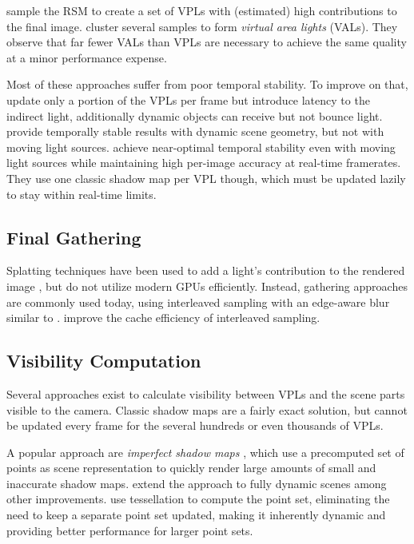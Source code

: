 \citet{georgiev2010simple, ritschel2011ismsViewAdaptive} sample the RSM to create a set of VPLs with (estimated) high contributions to the final image. \citet{dong2009real, prutkin2012reflective} cluster several samples to form \emph{virtual area lights} (VALs). They observe that far fewer VALs than VPLs are necessary to achieve the same quality at a minor performance expense.

Most of these approaches suffer from poor temporal stability. To improve on that, \citet{laine2007incremental} update only a portion of the VPLs per frame but introduce latency to the indirect light, additionally dynamic objects can receive but not bounce light. \citet{barak2013temporally} provide temporally stable results with dynamic scene geometry, but not with moving light sources. \citet{hedman2016sequential} achieve near-optimal temporal stability even with moving light sources while maintaining high per-image accuracy at real-time framerates. They use one classic shadow map per VPL though, which must be updated lazily to stay within real-time limits.


\subsection{Final Gathering}
\label{sec:intro:relatedWorkManyLight:finalGathering}

Splatting techniques have been used to add a light's contribution to the rendered image \citep{dachsbacher2006splatting, Nichols:2009:splatting}, but do not utilize modern GPUs efficiently. Instead, gathering approaches are commonly used today, using interleaved sampling \citep{Keller:2001:InterleavedSampling} with an edge-aware blur similar to \citet{laine2007incremental}. \citet{segovia2006non} improve the cache efficiency of interleaved sampling.


\subsection{Visibility Computation}
\label{sec:intro:relatedWorkManyLight:visibility}

Several approaches exist to calculate visibility between VPLs and the scene parts visible to the camera. Classic shadow maps are a fairly exact solution, but cannot be updated every frame for the several hundreds or even thousands of VPLs.

A popular approach are \emph{imperfect shadow maps} \citep[ISMs,][]{ritschel2008ism}, which use a precomputed set of points as scene representation to quickly render large amounts of small and inaccurate shadow maps. \citet{ritschel2011ismsViewAdaptive} extend the approach to fully dynamic scenes among other improvements. \citet{barak2013temporally} use tessellation to compute the point set, eliminating the need to keep a separate point set updated, making it inherently dynamic and providing better performance for larger point sets.

